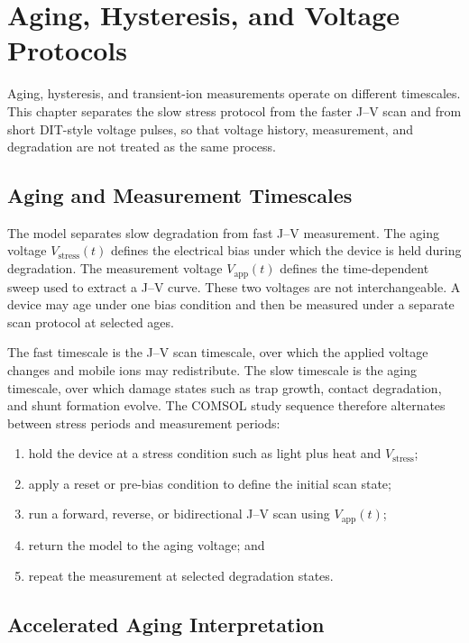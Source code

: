 \chapter{Aging, Hysteresis, and Voltage Protocols}

Aging, hysteresis, and transient-ion measurements operate on different
timescales. This chapter separates the slow stress protocol from the faster
J--V scan and from short DIT-style voltage pulses, so that voltage history,
measurement, and degradation are not treated as the same process.

\section{Aging and Measurement Timescales}

The model separates slow degradation from fast J--V measurement. The aging
voltage $V_{\mathrm{stress}}(t)$ defines the electrical bias under which the
device is held during degradation. The measurement voltage
$V_{\mathrm{app}}(t)$ defines the time-dependent sweep used to extract a J--V
curve. These two voltages are not interchangeable. A device may age under one
bias condition and then be measured under a separate scan protocol at selected
ages.

The fast timescale is the J--V scan timescale, over which the applied voltage
changes and mobile ions may redistribute. The slow timescale is the aging
timescale, over which damage states such as trap growth, contact degradation,
and shunt formation evolve. The COMSOL study sequence therefore alternates
between stress periods and measurement periods:
\begin{enumerate}
\item hold the device at a stress condition such as light plus heat and
$V_{\mathrm{stress}}$;
\item apply a reset or pre-bias condition to define the initial scan state;
\item run a forward, reverse, or bidirectional J--V scan using
$V_{\mathrm{app}}(t)$;
\item return the model to the aging voltage; and
\item repeat the measurement at selected degradation states.
\end{enumerate}

\section{Accelerated Aging Interpretation}

